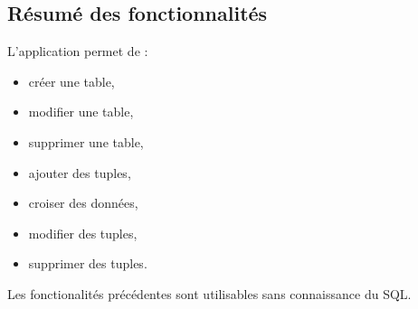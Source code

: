 \subsection{Résumé des fonctionnalités}
L'application permet de :
\begin{itemize}
\item créer une table,
\item modifier une table,
\item supprimer une table,
\item ajouter des tuples,
\item croiser des données,
\item modifier des tuples,
\item supprimer des tuples.
\end{itemize}

Les fonctionalités précédentes sont utilisables sans connaissance du SQL.

